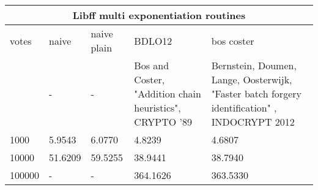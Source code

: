 \documentclass{standalone}
\begin{document}
\begin{tabular}{ |p{1cm}|p{1cm}|p{1cm}|p{5cm}|p{5cm}| }
    \hline
    \multicolumn{5}{|c|}{Libff multi exponentiation routines} \\
    \hline
    votes & naive & naive plain & BDLO12 & bos coster \\
    \hline
     & - & - & Bos and Coster, "Addition chain heuristics", CRYPTO '89 &
     Bernstein, Doumen, Lange, Oosterwijk, "Faster batch forgery identification"
     , INDOCRYPT 2012 \\
     \hline
    1000 & 5.9543 & 6.0770 & 4.8239 & 4.6807 \\
    10000 & 51.6209 & 59.5255 & 38.9441 & 38.7940 \\
    100000 & - & - & 364.1626 & 363.5330 \\
    \hline
\end{tabular}
\end{document}
